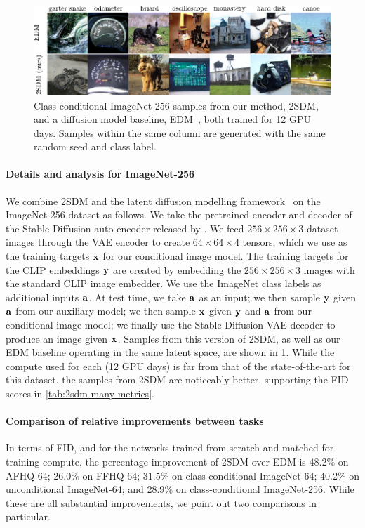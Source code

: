 \begin{figure}[t]
    \includegraphics[width=\textwidth]{figs/2sdm/2SDM-main-fig.pdf}
    \caption{Class-conditional ImageNet-256 samples from our method, 2SDM, and a diffusion model baseline, EDM~\citep{karras2022elucidating}, both trained for 12 GPU days. Samples within the same column are generated with the same random seed and class label.}
    \label{fig:latent-imagenet-samples}
\end{figure}

\paragraph{Details and analysis for ImageNet-256}
We combine 2SDM and the latent diffusion modelling framework~\citep{rombach2022high} on the ImageNet-256 dataset as follows. We take the pretrained encoder and decoder of the Stable Diffusion auto-encoder released by \citet{rombach2022high}. We feed $256\times256\times3$ dataset images through the VAE encoder to create $64\times64\times4$ tensors, which we use as the training targets ${\mathbf{x}}$ for our conditional image model. The training targets for the CLIP embeddings ${\mathbf{y}}$ are created by embedding the $256\times256\times3$ images with the standard CLIP image embedder. We use the ImageNet class labels as additional inputs ${\mathbf{a}}$. At test time, we take ${\mathbf{a}}$ as an input; we then sample ${\mathbf{y}}$ given ${\mathbf{a}}$ from our auxiliary model; we then sample ${\mathbf{x}}$ given ${\mathbf{y}}$ and ${\mathbf{a}}$ from our conditional image model; we finally use the Stable Diffusion VAE decoder to produce an image given ${\mathbf{x}}$. Samples from this version of 2SDM, as well as our EDM baseline operating in the same latent space, are shown in \cref{fig:latent-imagenet-samples}. While the compute used for each (12 GPU days) is far from that of the state-of-the-art for this dataset, the samples from 2SDM are noticeably better, supporting the FID scores in \cref{tab:2sdm-many-metrics}.

\paragraph{Comparison of relative improvements between tasks}
In terms of FID, and for the networks trained from scratch and matched for training compute, the percentage improvement of 2SDM over EDM is $48.2\%$ on AFHQ-64; $26.0\%$ on FFHQ-64; $31.5\%$ on class-conditional ImageNet-64; $40.2\%$ on unconditional ImageNet-64; and $28.9\%$ on class-conditional ImageNet-256. While these are all substantial improvements, we point out two comparisons in particular. 

